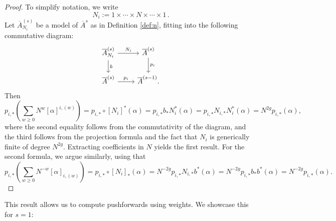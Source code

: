 \documentclass[11pt]{article}
\newcommand{\barA}{\overline{A}}
\theoremstyle{definition}
\begin{document}
\begin{proof}
    To simplify notation, we write
    \begin{equation*}
    N_i := 1 \times \cdots \times N \times \cdots \times 1\,.
    \end{equation*}
    Let $\barA^{(s)}_{N_i}$ be a model of $\barA^{s}$ as in Definition \ref{def:n}, fitting
    into the following commutative diagram:
    \[
    \begin{tikzcd}
        \barA^{(s)}_{N_i} \ar[r,"N_i"] \ar[d,"b"] & \barA^{(s)} \ar[d,"p_i"] \\
        \barA^{(s)} \ar[r,"p_i"] & \barA^{(s-1)} .
    \end{tikzcd}
    \]
    Then
    \[
    p_{i,*} \left(\sum_{w\geq 0} N^w[\alpha]^{i,(w)}\right) = p_{i,*} \circ [N_i]^*(\alpha)
    =
    p_{i,*} b_* N_i^*(\alpha)
    =
    p_{i,*} N_{i,*} N_i^*(\alpha)
    =
    N^{2g} p_{i,*}(\alpha),
    \]
    where the second equality follows from the commutativity of the diagram,
    and the third follows from the projection formula and the fact that $N_i$
    is generically finite of degree $N^{2g}$. Extracting coefficients in $N$ yields the first result.
    For the second formula, we argue similarly, using that
    $$
    p_{i,*} \left(\sum_{w\geq 0} N^{-w}[\alpha]_{i,(w)}\right) = p_{i,*} \circ [N_i]_*(\alpha)
    =
    N^{-2g}p_{i,*} N_{i,*}b^*(\alpha)
    =
    N^{-2g}p_{i,*} b_{*} b^*(\alpha)
    =
    N^{-2g} p_{i,*}(\alpha).
    $$
\end{proof}

This result allows us to compute pushforwards using weights. We showcase this for $s=1$:
\end{document}
